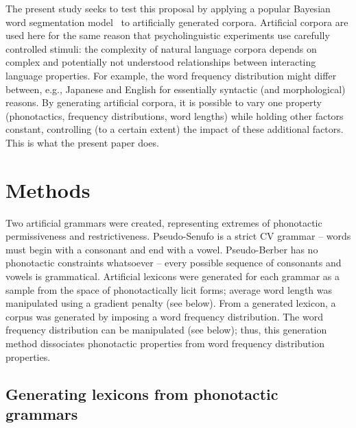 \documentclass[11pt]{article}
\begin{document}
The present study seeks to test this proposal by applying a popular Bayesian word segmentation model~\cite{Brent99a,Goldwater07c,Goldwater09a} to artificially generated corpora. Artificial corpora are used here for the same reason that psycholinguistic experiments use carefully controlled stimuli: the complexity of natural language corpora depends on complex and potentially not understood relationships between interacting language properties. For example, the word frequency distribution might differ between, e.g., Japanese and English for essentially syntactic (and morphological) reasons. By generating artificial corpora, it is possible to vary one property (phonotactics, frequency distributions, word lengths) while holding other factors constant, controlling (to a certain extent) the impact of these additional factors. This is what the present paper does.

\section{Methods}
\vspace*{-5pt}
Two artificial grammars were created, representing extremes of phonotactic permissiveness and restrictiveness. Pseudo-Senufo is a strict CV grammar -- words must begin with a consonant and end with a vowel.
Pseudo-Berber has no phonotactic constraints whatsoever -- every possible sequence of consonants and vowels is grammatical. Artificial lexicons were generated for each grammar as a sample from the space of phonotactically licit forms; average word length was manipulated using a gradient penalty (see below). From a generated lexicon, a corpus was generated by imposing a word frequency distribution. The word frequency distribution can be manipulated (see below); thus, this generation method dissociates phonotactic properties from word frequency distribution properties.
 
\subsection{Generating lexicons from phonotactic grammars}
\end{document}
